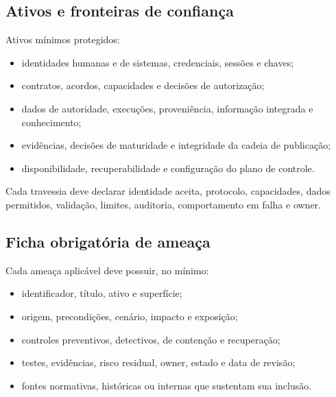\documentclass[11pt,a4paper,oneside]{article}
\begin{document}
\subsection{Ativos e fronteiras de confiança}
Ativos mínimos protegidos:
\begin{itemize}
  \item identidades humanas e de sistemas, credenciais, sessões e chaves;
  \item contratos, acordos, capacidades e decisões de autorização;
  \item dados de autoridade, execuções, proveniência, informação integrada e conhecimento;
  \item evidências, decisões de maturidade e integridade da cadeia de publicação;
  \item disponibilidade, recuperabilidade e configuração do plano de controle.
\end{itemize}

\begin{center}
\end{center}

Cada travessia deve declarar identidade aceita, protocolo, capacidades, dados permitidos, validação, limites, auditoria, comportamento em falha e owner.

\subsection{Ficha obrigatória de ameaça}
Cada ameaça aplicável deve possuir, no mínimo:
\begin{itemize}
  \item identificador, título, ativo e superfície;
  \item origem, precondições, cenário, impacto e exposição;
  \item controles preventivos, detectivos, de contenção e recuperação;
  \item testes, evidências, risco residual, owner, estado e data de revisão;
  \item fontes normativas, históricas ou internas que sustentam sua inclusão.
\end{itemize}
\end{document}
